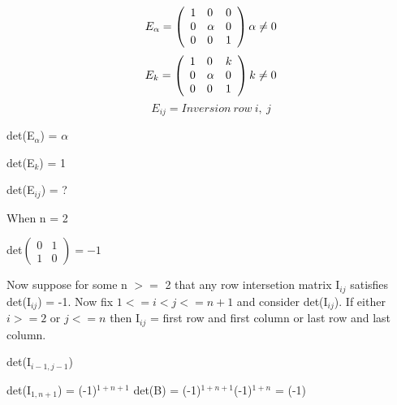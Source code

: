 \[ E_\alpha = \left( \begin{array}{lll} 1 & 0 & 0 \\ 0 & \alpha & 0 \\ 0 & 0 & 1 \end{array} \right) \\ \alpha \neq 0\]
\[ E_k = \left( \begin{array}{lll} 1 & 0 & k \\ 0 & \alpha & 0 \\ 0 & 0 & 1 \end{array} \right) \\ k \neq 0\]
\[ E_{ij} = Inversion\ row\ i,\ j \]

det(E$_\alpha$) = $\alpha$

det(E$_k$) = 1

det(E$_{ij}$) = ?

When n = 2 

det$\left( \begin{array}{ll} 0 & 1 \\ 1 & 0 \end{array} \right) = -1 $

Now suppose for some n $>=$ 2 that any row intersetion matrix I$_{ij}$ satisfies det(I$_{ij}$) = -1. Now fix $1<= i < j <= n+1 $ and consider det(I$_{ij}$). If either $i>=2$ or $j<=n$ then I$_{ij}$ = first row and first column or last row and last column.

det(I$_{i-1,j-1}$)


det(I$_{1, n+1}$) = (-1)$^{1+n+1}$ det(B) = (-1)$^{1+n+1}$(-1)$^{1+n}$ = (-1)